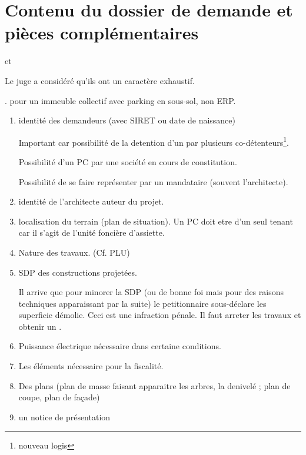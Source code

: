 \section{Contenu du dossier de demande et pièces complémentaires}

	 et 

	Le juge a considéré qu'ils ont un caractère exhaustif.

	\jurisCE{}. \PC pour un immeuble collectif avec parking en sous-sol, non ERP.

	\begin{enumerate}
		\item identité des demandeurs (avec SIRET ou date de naissance)

			Important car possibilité de la detention d'un \PC par plusieurs co-détenteurs\footnote{ nouveau logis}.

			Possibilité d'un PC par une société en cours de constitution.

			Possibilité de se faire représenter par un mandataire (souvent l'architecte).

		\item identité de l'architecte auteur du projet.

		\item localisation du terrain (plan de situation). Un PC doit etre d'un seul tenant car il s'agit de l'unité foncière d'assiette.

		\item Nature des travaux. (Cf. PLU)

		\item SDP des constructions projetées.

		Il arrive que pour minorer la SDP (ou de bonne foi mais pour des raisons techniques apparaissant par la suite) le petitionnaire sous-déclare les superficie démolie. Ceci est une infraction pénale. Il faut arreter les travaux et obtenir un \PCM.

		\item Puissance électrique nécessaire dans certaine conditions.

		\item Les éléments nécessaire pour la fiscalité.

		\item Des plans (plan de masse faisant apparaitre les arbres, la denivelé ; plan de coupe, plan de façade)

		\item un notice de présentation
	\end{enumerate}

